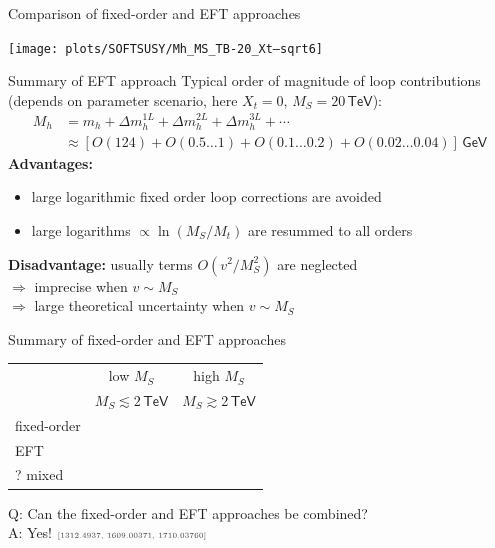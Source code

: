 \documentclass[hyperref={pdfpagelabels=false},ngerman]{beamer}
\newcommand{\cmark}{\ding{51}}%
\newcommand{\xmark}{\ding{55}}%
\newcommand{\eh}[1]{\,\mathsf{#1}}
\newcommand{\ok}{\textcolor{darkgreen}{\cmark}}
\newcommand{\notok}{\textcolor{red}{\xmark}}
\newcommand{\MS}{\ensuremath{M_S}}
\newcommand{\mycite}[1]{\ensuremath{\text{\textcolor{darkgray}{\tiny [#1]}}}}
\renewcommand{\emph}{\textbf}
\begin{document}
\begin{frame}{Comparison of fixed-order and EFT approaches}
  \begin{center}
    \texttt{[image: plots/SOFTSUSY/Mh\_MS\_TB-20\_Xt--sqrt6]}
  \end{center}
\end{frame}

\begin{frame}{Summary of EFT approach}
  Typical order of magnitude of loop contributions (depends on
  parameter scenario, here $X_t = 0$, $\MS = 20\eh{TeV}$):
  \begin{align*}
    M_h &= m_h + \Delta m_h^{1L} + \Delta m_h^{2L} + \Delta m_h^{3L} + \cdots \\
    &\approx [O(124) + O(0.5\ldots 1) + O(0.1\ldots 0.2) + O(0.02\ldots 0.04)] \eh{GeV}
  \end{align*}
  \emph{Advantages:}
  \begin{itemize}
  \item large logarithmic fixed order loop corrections are avoided
  \item large logarithms $\propto\ln(M_S/M_t)$ are resummed to all orders
  \end{itemize}
  \emph{Disadvantage:} usually terms $O(v^2/M_S^2)$ are neglected \\
  $\Rightarrow$ imprecise when $v \sim \MS$ \\
  $\Rightarrow$ large theoretical uncertainty when $v \sim \MS$
\end{frame}

\begin{frame}{Summary of fixed-order and EFT approaches}
  \begin{center}
    \begin{tabular}{lcc}
      \toprule
                  & low $\MS$ & high $\MS$ \\
                  & $\MS \lesssim 2\eh{TeV}$ & $\MS \gtrsim 2\eh{TeV}$ \\
      \midrule
      fixed-order & \ok       & \notok     \\
      EFT         & \notok    & \ok        \\
      ? mixed     & \ok       & \ok        \\
      \bottomrule
    \end{tabular}
  \end{center}
  \vspace{2em}
  Q: Can the fixed-order and EFT approaches be combined? \\[1em]
  A: Yes!  \mycite{1312.4937, 1609.00371, 1710.03760}
\end{frame}
\end{document}
